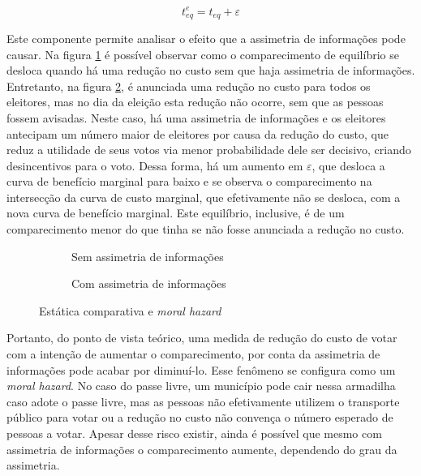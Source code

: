 \begin{equation}
\label{eq_expectativas}
    t_{eq}^{e} = t_{eq} + \varepsilon
\end{equation}

Este componente permite analisar o efeito que a assimetria de informações pode causar. Na figura \ref{fig_static3} é possível observar como o comparecimento de equilíbrio se desloca quando há uma redução no custo sem que haja assimetria de informações. Entretanto, na figura \ref{fig_static4}, é anunciada uma redução no custo para todos os eleitores, mas no dia da eleição esta redução não ocorre, sem que as pessoas fossem avisadas. Neste caso, há uma assimetria de informações e os eleitores antecipam um número maior de eleitores por causa da redução do custo, que reduz a utilidade de seus votos via menor probabilidade dele ser decisivo, criando desincentivos para o voto. Dessa forma, há um aumento em $\varepsilon$, que desloca a curva de benefício marginal para baixo e se observa o comparecimento na intersecção da curva de custo marginal, que efetivamente não se desloca, com a nova curva de benefício marginal. Este equilíbrio, inclusive, é de um comparecimento menor do que tinha se não fosse anunciada a redução no custo.

\begin{figure}[!ht]
    \begin{subfigure}[t]{0.45\linewidth}
      
      \caption{Sem assimetria de informações}
      \label{fig_static3}
    \end{subfigure}
    \hfill
    \begin{subfigure}[t]{0.45\linewidth}
      
      \caption{Com assimetria de informações}
      \label{fig_static4}
    \end{subfigure}
    \caption{Estática comparativa e \textit{moral hazard}}
    \label{fig_staticB}
  \end{figure}

Portanto, do ponto de vista teórico, uma medida de redução do custo de votar com a intenção de aumentar o comparecimento, por conta da assimetria de informações pode acabar por diminuí-lo. Esse fenômeno se configura como um \textit{moral hazard}. No caso do passe livre, um município pode cair nessa armadilha caso adote o passe livre, mas as pessoas não efetivamente utilizem o transporte público para votar ou a redução no custo não convença o número esperado de pessoas a votar. Apesar desse risco existir, ainda é possível que mesmo com assimetria de informações o comparecimento aumente, dependendo do grau da assimetria.  
  
